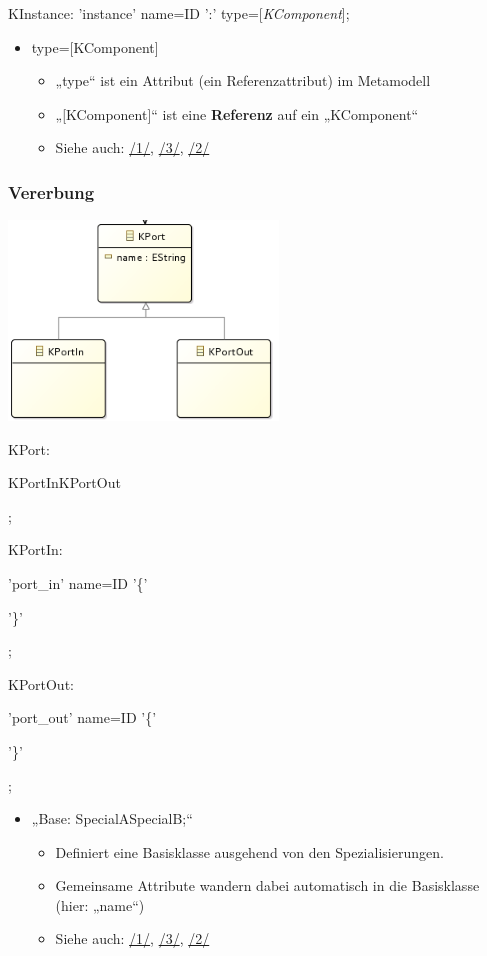 \documentclass[a4]{article}
\providecommand{\tightlist}{%
  \setlength{\itemsep}{0pt}\setlength{\parskip}{0pt}}
\begin{document}
KInstance: 'instance' name=ID ':' type={[}\emph{KComponent}{]};

\begin{itemize}
\item
  type={[}KComponent{]}

  \begin{itemize}
  \tightlist
  \item
    „type`` ist ein Attribut (ein Referenzattribut) im Metamodell
  \item
    „{[}KComponent{]}`` ist eine \textbf{Referenz} auf ein „KComponent``
  \item
    Siehe auch: \protect\hyperlink{anchor-1}{/1/},
    \protect\hyperlink{anchor-3}{/3/}, \protect\hyperlink{anchor-2}{/2/}
  \end{itemize}
\end{itemize}

\subsubsection[Vererbung]{\texorpdfstring{\protect\hypertarget{anchor-25}{}{}Vererbung}{Vererbung}}\label{vererbung}

\includegraphics[width=2.82520in,height=2.09170in]{./Pictures/1000020100000153000000FB3A29A3A8CA4988F4.png}

KPort:

KPortIn\textbar{}KPortOut

;

KPortIn:

'port\_in' name=ID '\{'

'\}'

;

KPortOut:

'port\_out' name=ID '\{'

'\}'

;

\begin{itemize}
\item
  „Base: SpecialA\textbar{}SpecialB;``

  \begin{itemize}
  \tightlist
  \item
    Definiert eine Basisklasse ausgehend von den Spezialisierungen.
  \item
    Gemeinsame Attribute wandern dabei automatisch in die Basisklasse
    (hier: „name``)
  \item
    Siehe auch: \protect\hyperlink{anchor-1}{/1/},
    \protect\hyperlink{anchor-3}{/3/}, \protect\hyperlink{anchor-2}{/2/}
  \end{itemize}
\end{itemize}
\end{document}
